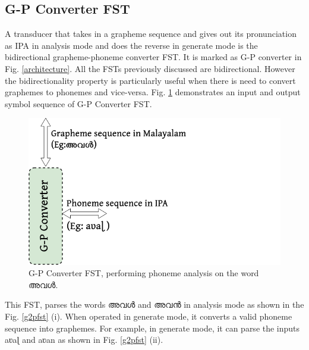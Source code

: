 \documentclass{ieeeaccess}
\begin{document}
\subsection{G-P Converter FST}

A transducer that takes in a grapheme sequence and gives out its pronunciation as IPA in analysis mode and does the reverse in generate mode is the bidirectional grapheme-phoneme converter FST. It is marked as G-P converter in Fig. \ref{architecture}. All the FSTs previously discussed are bidirectional. However the bidirectionality property is particularly useful when there is need to convert graphemes to phonemes and vice-versa. Fig. \ref{gpconverterfst} demonstrates an  input and output symbol sequence of G-P Converter FST.


\begin{figure}[!h]
	\centering
	\includegraphics[scale=0.25]{g-pconverter-drawio.png}
	\caption{G-P Converter FST, performing phoneme analysis on the word {\mal അവൾ}.}
	\label{gpconverterfst}
\end{figure}


This FST, parses the words {\mal അവൾ} and {\mal അവൻ} in analysis mode as shown in the Fig. \ref{g2pfst} (i). When operated in generate mode, it  converts a valid phoneme sequence into graphemes. For example, in generate mode, it can parse the inputs {\ipa aʋaɭ} and {\ipa aʋan} as shown in Fig. \ref{g2pfst} (ii).
\end{document}
